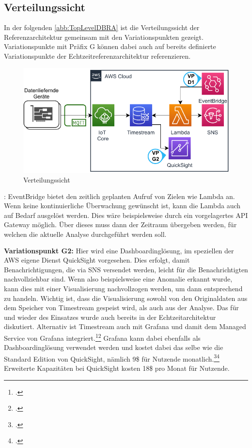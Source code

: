 \subsection{Verteilungssicht}
In der folgenden \autoref{abb:TopLevelDBRA} ist die Verteilungssicht der Referenzarchitektur gemeinsam mit den Variationspunkten gezeigt. Variationspunkte mit Präfix G können dabei auch auf bereits definierte Variationspunkte der Echtzeitreferenzarchitektur referenzieren.
\begin{figure}[H]
\centering
\includegraphics[width=\textwidth]{graphics/DB-RA-Overview.pdf}
\caption{Verteilungssicht}
\label{abb:TopLevelDBRA}
\end{figure}

: EventBridge bietet den zeitlich geplanten Aufruf von Zielen wie Lambda an. Wenn keine kontinuierliche Überwachung gewünscht ist, kann die Lambda auch auf Bedarf ausgelöst werden. Dies wäre beispielsweise durch ein vorgelagertes API Gateway möglich. Über dieses muss dann der Zeitraum übergeben werden, für welchen die aktuelle Analyse durchgeführt werden soll.

\textbf{Variationspunkt G2:} Hier wird eine Dashboardinglösung, im speziellen der \ac{AWS} eigene Dienst QuickSight vorgesehen. Dies erfolgt, damit Benachrichtigungen, die via \ac{SNS} versendet werden, leicht für die Benachrichtigten nachvollziehbar sind. Wenn also beispielsweise eine Anomalie erkannt wurde, kann dies mit einer Visualisierung nachvollzogen werden, um dann entsprechend zu handeln. Wichtig ist, dass die Visualisierung sowohl von den Originaldaten aus dem Speicher von Timestream gespeist wird, als auch aus der Analyse. Das für und wieder des Einsatzes wurde auch bereits in  der Echtzeitarchitektur diskutiert. Alternativ ist Timestream auch mit Grafana und damit dem Managed Service von Grafana integriert.\footcite[Vgl.][]{AmazonWebServicesInc..o.J.bm}\nzitat\footcite[Vgl.][]{Dutt.2020} Grafana kann dabei ebenfalls als Dashboardinglösung verwendet werden und kostet dabei das selbe wie die Standard Edition von QuickSight, nämlich 9\$ für Nutzende monatlich.\footcite[Vgl. auch im Foglenden][]{AmazonWebServicesInc..o.J.bn}\nzitat\footcite[Vgl.][]{AmazonWebServicesInc..o.J.bo} Erweiterte Kapazitäten bei QuickSight kosten 18\$ pro Monat für Nutzende. 




